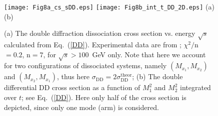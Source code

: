 \documentclass[12pt]{article}
\begin{document}
\begin{figure}[p] %
 {\centering
 \texttt{[image: Fig8a\_cs\_sDD.eps]}
 \texttt{[image: Fig8b\_int\_t\_DD\_2D.eps]}
 {(a)\hspace{0.5\linewidth}(b)}
 }
  \caption{
  (a) The double diffraction dissociation cross section vs. energy $\sqrt{s}$ calculated from Eq.~(\ref{DD}).
  Experimental data are from \cite{Poghosyan for ALICE, Affolder.DD, [tmp6].Ansorge.UA5}; $\chi^2/$n$=0.2$, n$=7$, for $\sqrt{s}>100$~GeV only. Note that here we account for two configurations of dissociated systems, namely $(M_{x_1},M_{x_2})$ and $(M_{x_2},M_{x_1})$, thus here \mbox{$\sigma_\mathrm{DD}=2\sigma^{\mbox{theor}}_\mathrm{DD}$};
    (b) The double differential DD cross section as a function of $M_1^2$ and $M_2^2$ integrated over $t$; see Eq.~(\ref{DD}). Here only half of the cross section is depicted, since only one mode (arm) is considered.}
  \label{cs.DD}
\end{figure}

\newpage
\newpage
\end{document}
